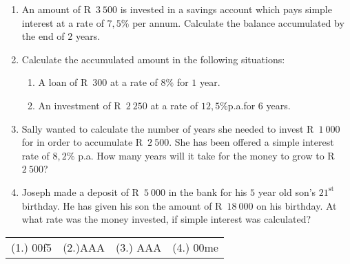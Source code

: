 % 
% 
% 
% 

\begin{exercises}{}{
    \begin{enumerate}[itemsep=6pt, label=\textbf{\arabic*}.]
	\item An amount of R~$3~500$ is invested in a savings account which pays simple interest at a rate of $7,5\%$ per annum. Calculate the balance accumulated by the end of $2$ years.

	\item Calculate the accumulated amount in the following situations:
	\begin{enumerate}[noitemsep, label=\textbf{(\alph*)} ]
	    \item A loan of R~$300$ at a rate of $8\%$ for $1$ year.

	    \item An investment of R~$2~250$ at a rate of $12,5\%$p.a.\@ for $6$ years.
	\end{enumerate}

	\item Sally wanted to calculate the number of years she needed to invest R~$1~000$ for in order to accumulate R~$2~500$. She has been offered a simple interest rate of $8,2\%$ p.a. How many years will it take for the money to grow to R~$2~500$?

	\item Joseph made a deposit of R~$5~000$ in the bank for his $5$ year old son's $21^{\mathrm{st}}$ birthday. He has given his son the amount of R~$18~000$ on his birthday. At what rate was the money invested, if simple interest was calculated?
    \end{enumerate}
\practiceinfo

    \begin{tabularx}{\textwidth}{ XXXX }
	(1.) 00f5&(2.)AAA	&(3.)	AAA&	(4.) 00me
    \end{tabularx}
}
\end{exercises}


